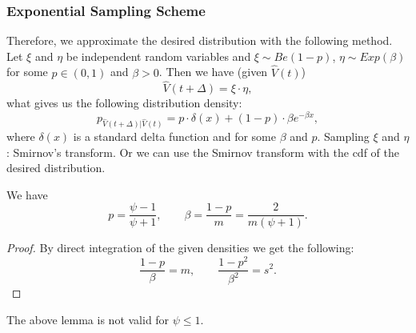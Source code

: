             \subsubsection{Exponential Sampling Scheme}
                Therefore, we approximate the desired distribution with the following method. Let $\xi$ and $\eta$ be 
                independent random variables and  $\xi \sim Be(1-p)$, $\eta \sim Exp(\beta)$ for some $p \in (0, 1)$ 
                and $\beta > 0$. Then we have (given $\hat{V}(t)$)
                \begin{equation}
                    \hat{V}(t+\Delta) = \xi\cdot\eta,
                \end{equation}
                what gives us the following distribution density:
                \begin{equation}
                    p_{\hat{V}(t+\Delta)\vert \hat{V}(t)} = p\cdot \delta(x) + (1-p) \cdot\beta e^{-\beta x},
                \end{equation}
                where $\delta(x)$ is a standard delta function and for some $\beta$ and $p$.
                Sampling $\xi$ and $\eta$: Smirnov's transform. Or we can use the Smirnov transform with the cdf of 
                the desired distribution.
                \begin{lemma}
                    We have
                    \begin{equation}
                        p     = \frac{\psi - 1}{\psi + 1}, \qquad \beta = \frac{1-p}{m} = \frac{2}{m(\psi+1)}.
                    \end{equation}
                \end{lemma}
                \begin{proof}
                    {\color{red}By direct integration of the given densities we get the following:}
                    \begin{equation}
                        \frac{1-p}{\beta} = m, \qquad \frac{1-p^2}{\beta^2} = s^2.
                    \end{equation}
                \end{proof}
                \begin{remark}
                    The above lemma is not valid for $\psi \leq 1$.
                \end{remark}

